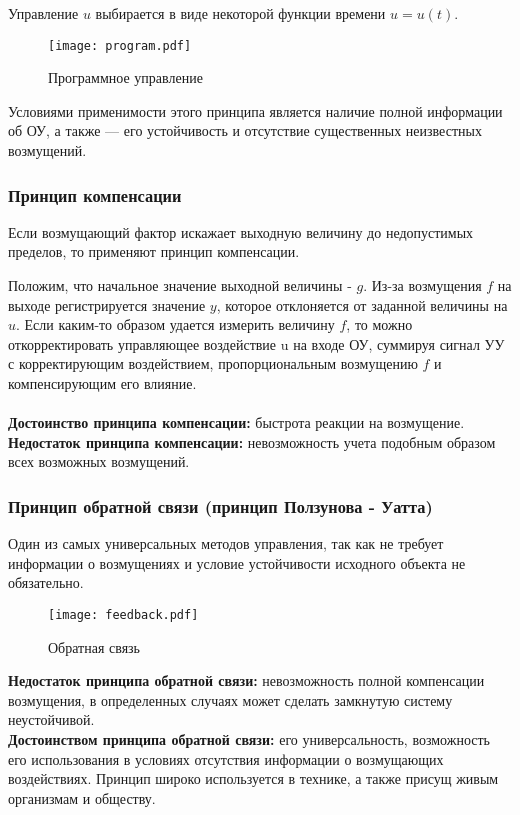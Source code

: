 \documentclass[../../TAU.tex]{subfiles}
\begin{document}
    Управление $u$ выбирается в виде некоторой функции времени $u = u(t)$.

    \begin{figure}[h]
    \centering
    \texttt{[image: program.pdf]}
    \caption{Программное управление}
    \centering
    \end{figure}

    Условиями применимости этого принципа является наличие полной информации об ОУ, а также --- его устойчивость и отсутствие существенных неизвестных возмущений.

\subsubsection{Принцип компенсации}
    Если возмущающий фактор искажает выходную величину до недопустимых пределов, то применяют принцип компенсации. \par
    Положим, что начальное значение выходной величины - $g$. Из-за возмущения $f$ на выходе регистрируется значение $y$, которое отклоняется от заданной величины на $u$. 
    Если каким-то образом удается измерить величину $f$, то можно откорректировать управляющее воздействие u на входе ОУ, суммируя сигнал УУ с корректирующим воздействием, пропорциональным возмущению $f$ и компенсирующим его влияние.\\\\
    {\bf Достоинство принципа компенсации:} быстрота реакции на возмущение. \\
    {\bf Недостаток принципа компенсации:} невозможность учета подобным образом всех возможных возмущений.

\subsubsection{Принцип обратной связи (принцип Ползунова - Уатта)}
    Один из самых универсальных методов управления, так как не требует информации о возмущениях и условие устойчивости исходного объекта не обязательно.


    \begin{figure}[h]
    \centering
    \texttt{[image: feedback.pdf]}
    \caption{Обратная связь}
    \centering
    \end{figure}

    {\bf Недостаток принципа обратной связи:} невозможность полной компенсации возмущения, в определенных случаях может сделать замкнутую систему неустойчивой. \\
    {\bf Достоинством принципа обратной связи:} его универсальность, возможность его использования в условиях отсутствия информации о возмущающих воздействиях. Принцип широко используется в технике, а также присущ живым организмам и обществу.
\end{document}
